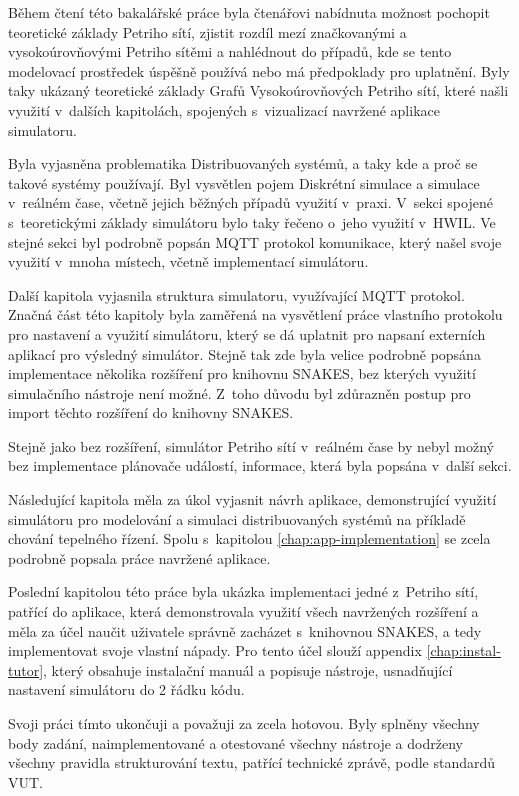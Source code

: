 Během čtení této bakalářské práce byla čtenářovi nabídnuta možnost pochopit teoretické základy Petriho sítí, zjistit rozdíl mezí značkovanými a vysokoúrovňovými Petriho sítěmi a nahlédnout do případů, kde se tento modelovací prostředek úspěšně používá nebo má předpoklady pro uplatnění. Byly taky ukázaný teoretické základy Grafů Vysokoúrovňových Petriho sítí, které našli využití v~dalších kapitolách, spojených s~vizualizací navržené aplikace simulatoru.

Byla vyjasněna problematika Distribuovaných systémů, a taky kde a proč se takové systémy používají. Byl vysvětlen pojem Diskrétní simulace a simulace v~reálném čase, včetně jejich běžných případů využití v~praxi. V~sekci spojené s~teoretickými základy simulátoru bylo taky řečeno o~jeho využití v~HWIL. Ve stejné sekci byl podrobně popsán MQTT protokol komunikace, který našel svoje využití v~mnoha místech, včetně implementací simulátoru.

Další kapitola vyjasnila struktura simulatoru, využívající MQTT protokol. Značná část této kapitoly byla zaměřená na vysvětlení práce vlastního protokolu pro nastavení a využití simulátoru, který se dá uplatnit pro napsaní externích aplikací pro výsledný simulátor. Stejně tak zde byla velice podrobně popsána implementace několika rozšíření pro knihovnu SNAKES, bez kterých využití simulačního nástroje není možné. Z~toho důvodu byl zdůrazněn postup pro import těchto rozšíření do knihovny SNAKES.

Stejně jako bez rozšíření, simulátor Petriho sítí v~reálném čase by nebyl možný bez implementace plánovače událostí, informace, která byla popsána v~další sekci.

Následující kapitola měla za úkol vyjasnit návrh aplikace, demonstrující využití simulátoru pro modelování a simulaci distribuovaných systémů na příkladě chování tepelného řízení. Spolu s~kapitolou \ref{chap:app-implementation} se zcela podrobně popsala práce navržené aplikace.

Poslední kapitolou této práce byla ukázka implementaci jedné z~Petriho sítí, patřící do aplikace, která demonstrovala využití všech navržených rozšíření a měla za účel naučit uživatele správně zacházet s~knihovnou SNAKES, a tedy implementovat svoje vlastní nápady. Pro tento účel slouží appendix \ref{chap:instal-tutor}, který obsahuje instalační manuál a popisuje nástroje, usnadňující nastavení simulátoru do 2 řádku kódu.

Svoji práci tímto ukončuji a považuji za zcela hotovou. Byly splněny všechny body zadání, naimplementované a otestované všechny nástroje a dodrženy všechny pravidla strukturování textu, patřící technické zprávě, podle standardů VUT.




